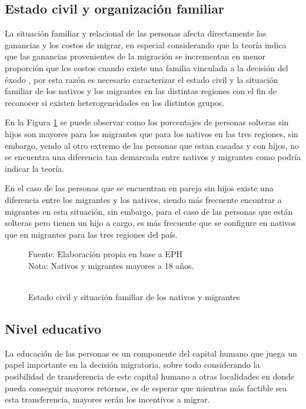 \documentclass[12pt,a4paper]{article}
\begin{document}
\subsection{Estado civil y organización familiar}

La situación familiar y relacional de las personas afecta directamente las ganancias y los costos de migrar, en especial considerando que la teoría indica que las ganancias provenientes de la migración se incrementan en menor proporción que los costos cuando existe una familia vinculada a la decisión del éxodo \parencite{mincer_family_1978}, por esta razón es necesario caracterizar el estado civil y la situación familiar de los nativos y los migrantes en las distintas regiones con el fin de reconocer si existen heterogeneidades en los distintos grupos.

En la Figura \ref{figure:estadociv_mig} se puede observar como los porcentajes de personas solteras sin hijos son mayores para los migrantes que para los nativos en las tres regiones, sin embargo, yendo al otro extremo de las personas que estan casadas y con hijos, no se encuentra una diferencia tan demarcada entre nativos y migrantes como podría indicar la teoría.

En el caso de las personas que se encuentran en pareja sin hijos  existe una diferencia entre los migrantes y los nativos, siendo más frecuente encontrar a migrantes en esta situación, sin embargo, para el caso de las personas que están solteras pero tienen un hijo a cargo, es más frecuente que se configure en nativos que en migrantes para las tres regiones del país.

\begin{figure}[ht!]
\begin{center}
\caption{\\Estado civil y situación familiar de los nativos y migrantes}
\label{figure:estadociv_mig}
 
\end{center}
\begin{flushleft}
\begin{scriptsize}
Fuente: Elaboración propia en base a EPH\\
Nota: Nativos y migrantes mayores a 18 años.
\end{scriptsize}
\end{flushleft}
\end{figure}

\subsection{Nivel educativo}
La educación de las personas es un componente del capital humano que juega un  papel importante en la decisión migratoria, sobre todo considerando la posibilidad de transferencia de este capital humano a otras localidades en donde pueda conseguir mayores retornos, es de esperar que mientras más factible sea esta transferencia, mayores serán los incentivos a migrar.
\end{document}
